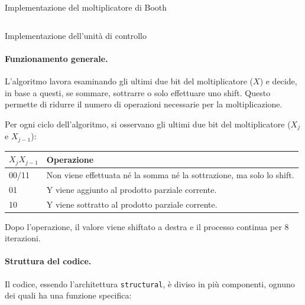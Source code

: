 \begin{code}
    \inputminted{vhdl}{vhdl/booth_multiplier.vhd}
    \caption{Implementazione del moltiplicatore di Booth}
    \label{cod:booth_multiplier}
\end{code}

\begin{code}
    \inputminted{vhdl}{vhdl/booth_multiplier_control_unit.vhd}
    \caption{Implementazione dell'unità di controllo}
    \label{cod:booth_multiplier_control_unit}
\end{code}

\paragraph{Funzionamento generale.}
L'algoritmo lavora esaminando gli ultimi due bit del moltiplicatore ($X$) e decide, in base a questi, se sommare, sottrarre o solo effettuare uno shift. Questo permette di ridurre il numero di operazioni necessarie per la moltiplicazione.

Per ogni ciclo dell'algoritmo, si osservano gli ultimi due bit del moltiplicatore ($X_j$ e $X_{j-1}$):

\begin{table}[h]
    \centering
    \begin{tabular}{|p{2cm}|p{10cm}|}
        \hline
        $X_j$$X_{j-1}$ & \textbf{Operazione} \\ \hline
        00/11 & Non viene effettuata né la somma né la sottrazione, ma solo lo shift. \\ \hline
        01 & Y viene aggiunto al prodotto parziale corrente. \\ \hline
        10 & Y viene sottratto al prodotto parziale corrente. \\ \hline
    \end{tabular}
\end{table}

Dopo l'operazione, il valore viene shiftato a destra e il processo continua per 8 iterazioni.

\paragraph{Struttura del codice.}
Il codice, essendo l'architettura \texttt{structural}, è diviso in più componenti, ognuno dei quali ha una funzione specifica:

